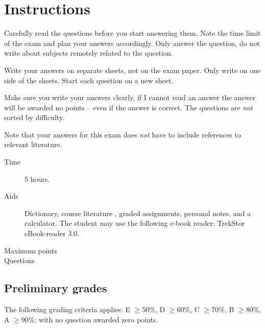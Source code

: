 \documentclass[addpoints]{miunexam}
\date{2014-01-13}
\author{%
	Daniel Bosk\\
  {\small\texttt{\href{mailto:daniel.bosk@miun.se}{daniel.bosk@miun.se}}}\\
  {\small\textit{Phone:} 060\,-\,14\,8709}\\
}
\begin{document}
\maketitle
\thispagestyle{foot}

\section*{Instructions}
\label{sec:Instructions}
\noindent
Carefully read the questions before you start answering them.
Note the time limit of the exam and plan your answers accordingly.
Only answer the question, do not write about subjects remotely related to the
question.

Write your answers on separate sheets, not on the exam paper.
Only write on one side of the sheets.
Start each question on a new sheet.

Make sure you write your answers clearly, if I cannot read an answer the answer
will be awarded no points -- even if the answer is correct.
The questions are \emph{not} sorted by difficulty.

Note that your answers for this exam does \emph{not} have to include references 
to relevant literature.

\begin{description}
	\item[Time] 5 hours.
  \item[Aids] Dictionary,
    course literature 
    \cite{Silberschatz2009osc,Silberschatz2013osc,Silberschatz2013intl},
    graded assignments,
    personal notes,
    and a calculator.
    The student may use the following e-book reader:
    TrekStor eBook-reader 3.0.
	\item[Maximum points] \numpoints
	\item[Questions] \numquestions
\end{description}


\subsection*{Preliminary grades}
\noindent
The following grading criteria applies:
E \(\geq 50\%\),
D \(\geq 60\%\),
C \(\geq 70\%\), 
B \(\geq 80\%\),
A \(\geq 90\%\);
with no question awarded zero points.
\end{document}
